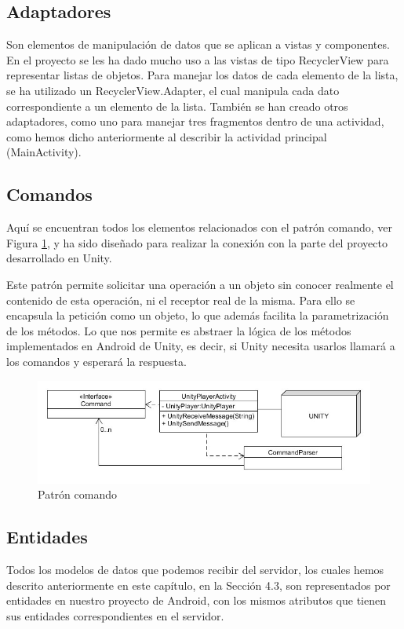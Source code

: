\subsection{Adaptadores}
\label{makereference4.4.2} 
Son elementos de manipulación de datos que se aplican a vistas y componentes. En el proyecto se les ha dado mucho uso a las vistas de tipo RecyclerView para representar listas de objetos. Para manejar los datos de cada elemento de la lista, se ha utilizado un RecyclerView.Adapter, el cual manipula cada dato correspondiente a un elemento de la lista. También se han creado otros adaptadores, como uno para manejar tres fragmentos dentro de una actividad, como hemos dicho anteriormente al describir la actividad principal (MainActivity).

\subsection{Comandos}
\label{makereference4.4.3}
Aquí se encuentran todos los elementos relacionados con el patrón comando, ver Figura \ref{fig:comando}, y ha sido diseñado para realizar la conexión con la parte del proyecto desarrollado en Unity.

Este patrón permite solicitar una operación a un objeto sin conocer realmente el contenido de esta operación, ni el receptor real de la misma. Para ello se encapsula la petición como un objeto, 
lo que además facilita la parametrización de los métodos.
Lo que nos permite es abstraer la lógica de los métodos implementados en Android de Unity, es decir, si Unity necesita usarlos llamará a los comandos y esperará la respuesta.

\begin{figure}[H]
    \centering
    \includegraphics[width=6in]{figures/chapter-4/Command.jpeg}
    \caption{Patrón comando}
    \label{fig:comando}
\end{figure}



\subsection{Entidades}
\label{makereference4.4.4}
Todos los modelos de datos que podemos recibir del servidor, los cuales hemos descrito anteriormente en este capítulo, en la Sección 4.3, son representados por entidades en nuestro proyecto de Android, con los mismos atributos que tienen sus entidades correspondientes en el servidor.


